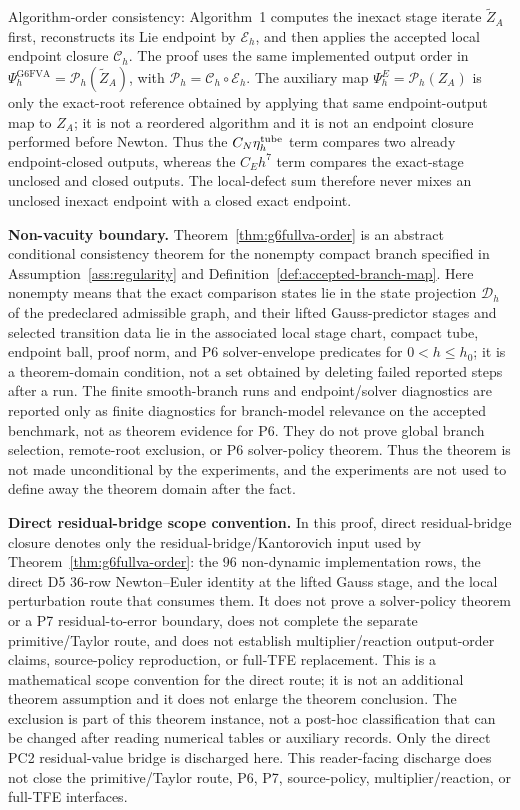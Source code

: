 \documentclass[preprint,12pt]{elsarticle}
\newcommand{\tfe}{TFE}
\begin{document}
Algorithm-order consistency: Algorithm~1 computes the inexact stage iterate
\(\widetilde Z_A\) first, reconstructs its Lie endpoint by \(\mathcal E_h\),
and then applies the accepted local endpoint closure \(\mathcal C_h\). The
proof uses the same implemented output order in
\(\Psi_h^{\mathrm{G6FVA}}=\mathcal P_h(\widetilde Z_A)\), with
\(\mathcal P_h=\mathcal C_h\circ\mathcal E_h\). The auxiliary map
\(\Psi_h^E=\mathcal P_h(Z_A)\) is only the exact-root reference obtained by
applying that same endpoint-output map to \(Z_A\); it is not a reordered
algorithm and it is not an endpoint closure performed before Newton. Thus the
\(C_N\eta_h^{\rm tube}\) term compares two already endpoint-closed outputs,
whereas the \(C_Eh^7\) term compares the exact-stage unclosed and closed
outputs. The local-defect sum therefore never mixes an unclosed inexact
endpoint with a closed exact endpoint.

\noindent\textbf{Non-vacuity boundary.}
Theorem~\ref{thm:g6fullva-order} is an abstract conditional consistency
theorem for the nonempty compact branch specified in
Assumption~\ref{ass:regularity} and
Definition~\ref{def:accepted-branch-map}. Here nonempty means that the exact
comparison states lie in the state projection \(\mathcal D_h\) of the
predeclared admissible graph, and their lifted Gauss-predictor stages and
selected transition data lie in the associated local stage chart, compact
tube, endpoint ball, proof norm, and P6 solver-envelope predicates for
\(0<h\le h_0\); it is a
theorem-domain condition, not a set obtained by deleting failed reported
steps after a run. The finite smooth-branch runs and
endpoint/solver diagnostics are reported only as finite diagnostics for
branch-model relevance on the accepted benchmark, not as theorem evidence for
P6. They do not prove global branch selection, remote-root exclusion, or P6
solver-policy theorem. Thus the theorem is not made unconditional by the
experiments, and the experiments are not used to define away the theorem
domain after the fact.

\noindent\textbf{Direct residual-bridge scope convention.}
In this proof, direct residual-bridge closure denotes only the
residual-bridge/Kantorovich input used by
Theorem~\ref{thm:g6fullva-order}: the 96 non-dynamic implementation rows, the
direct D5 36-row Newton--Euler identity at the lifted Gauss stage, and the
local perturbation route that consumes them.  It does not prove a
solver-policy theorem or a P7 residual-to-error boundary, does not complete the separate
primitive/Taylor route, and does not establish multiplier/reaction output-order
claims, source-policy reproduction, or full-\tfe{} replacement. This is a mathematical
scope convention for the direct route; it is not an additional theorem
assumption and it does not enlarge the theorem conclusion. The exclusion is
part of this theorem instance, not a post-hoc classification that can be
changed after reading numerical tables or auxiliary records.
Only the direct PC2 residual-value bridge is discharged here.  This
reader-facing discharge does not close the primitive/Taylor route, P6, P7,
source-policy, multiplier/reaction, or full-\tfe{} interfaces.
\end{document}
